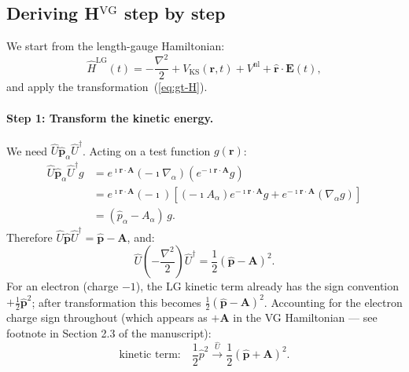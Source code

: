 \documentclass[11pt]{article}
\newcommand{\iunit}{\imath}          %
\newcommand{\Avec}{\mathbf{A}}
\newcommand{\phat}{\hat{\mathbf{p}}}
\newcommand{\Vnl}{V^{\mathrm{nl}}}
\newcommand{\HLG}{\hat{H}^{\mathrm{LG}}}
\begin{document}
\subsection{Deriving H$^\mathrm{VG}$ step by step}

We start from the length-gauge Hamiltonian:
\begin{equation}
  \HLG(t)
  = -\frac{\nabla^2}{2} + V_\mathrm{KS}(\mathbf{r},t)
  + \Vnl
  + \hat{\mathbf{r}}\cdot\mathbf{E}(t),
  \label{eq:HLG}
\end{equation}
and apply the transformation~(\ref{eq:gt-H}).

\paragraph{Step 1: Transform the kinetic energy.}
We need $\hat{U}\phat_\alpha\hat{U}^\dagger$.
Acting on a test function $g(\mathbf{r})$:
\begin{align}
  \hat{U}\phat_\alpha\hat{U}^\dagger g
  &= e^{\iunit\mathbf{r}\cdot\Avec}
     (-\iunit\nabla_\alpha)
     \!\left(e^{-\iunit\mathbf{r}\cdot\Avec}g\right)
  \nonumber\\
  &= e^{\iunit\mathbf{r}\cdot\Avec}
     (-\iunit)
     \!\left[(-\iunit A_\alpha)
     e^{-\iunit\mathbf{r}\cdot\Avec}g
     + e^{-\iunit\mathbf{r}\cdot\Avec}(\nabla_\alpha g)
     \right]
  \nonumber\\
  &= (\hat{p}_\alpha - A_\alpha)\,g.
  \label{eq:Uphat}
\end{align}
Therefore $\hat{U}\phat\hat{U}^\dagger = \phat - \Avec$, and:
\begin{equation}
  \hat{U}\!\left(-\frac{\nabla^2}{2}\right)\hat{U}^\dagger
  = \frac{1}{2}(\phat - \Avec)^2.
  \label{eq:UT}
\end{equation}
For an electron (charge $-1$), the LG kinetic term already has the
sign convention $+\frac{1}{2}\phat^2$; after transformation this
becomes $\frac{1}{2}(\phat-\Avec)^2$.
Accounting for the electron charge sign throughout
(which appears as $+\Avec$ in the VG Hamiltonian --- see footnote
in Section 2.3 of the manuscript):
\begin{equation}
  \text{kinetic term:}\quad
  \frac{1}{2}\hat{p}^2
  \xrightarrow{\hat{U}}
  \frac{1}{2}(\phat+\Avec)^2.
  \label{eq:kinetic-VG}
\end{equation}
\end{document}

